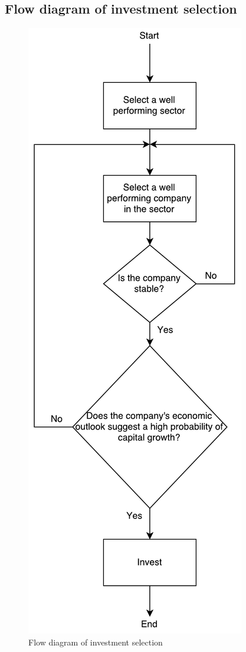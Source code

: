 \documentclass[letterpaper, 10 pt, conference]{ieeeconf}  %
\begin{document}

 

\cleardoublepage
\appendix

\subsection{Flow diagram of investment selection}


\begin{figure}[h!]
\centering
\includegraphics[scale=0.5]{decisions.pdf}
\caption{Flow diagram of investment selection}
\label{fig:flowChart}
\end{figure}
\end{document}
